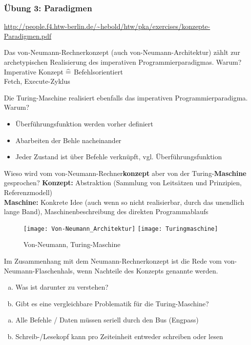 \begin{card}
	\frametitle{Übung 3: Paradigmen}
	\url{http://people.f4.htw-berlin.de/~hebold/htw/pka/exercises/konzepte-Paradigmen.pdf}
\end{card}

\begin{card}
	Das von-Neumann-Rechnerkonzept (auch von-Neumann-Architektur) zählt zur archetypischen Realisierung des imperativen Programmierparadigmas. Warum?
	\hr
	Imperative Konzept $\mathrel{\widehat{=}}$ Befehlsorientiert\\
	Fetch, Execute-Zyklus
\end{card}

\begin{card}
	Die Turing-Maschine realisiert ebenfalls das imperativen Programmierparadigma. Warum?
	\hr
	\begin{itemize}
	  \item Überführungsfunktion werden vorher definiert
	  \item Abarbeiten der Behle nacheinander
	  \item Jeder Zustand ist über Befehle verknüpft, vgl. Überführungsfunktion
	\end{itemize}
\end{card}

\begin{card}
	Wieso wird vom von-Neumann-Rechner\textbf{konzept} aber von der Turing-\textbf{Maschine} gesprochen?
	\hr
  \textbf{Konzept:} Abstraktion (Sammlung von Leitsätzen und Prinzipien, Referenzmodell)\\
  \textbf{Maschine:} Konkrete Idee (auch wenn so nicht realisierbar, durch das unendlich lange Band), Maschinenbeschreibung des direkten Programmablaufs
	\begin{figure}[h]
	\centering
	\texttt{[image: Von-Neumann\_Architektur]}
	\texttt{[image: Turingmaschine]}
	\caption{Von-Neumann, Turing-Maschine}
	\end{figure}
\end{card}

\begin{card}
	Im Zusammenhang mit dem Neumann-Rechnerkonzept ist die Rede vom von-Neumann-Flaschenhals, wenn Nachteile des Konzepts genannte werden.
	\begin{enumerate}[a)]
	\item Was ist darunter zu verstehen?
	\item Gibt es eine vergleichbare Problematik für die Turing-Maschine?
	\end{enumerate}
	\hr
	\begin{enumerate}[a)]
    \item Alle Befehle / Daten müssen seriell durch den Bus (Engpass)
    \item Schreib-/Lesekopf kann pro Zeiteinheit entweder schreiben oder lesen
	\end{enumerate}
\end{card}

